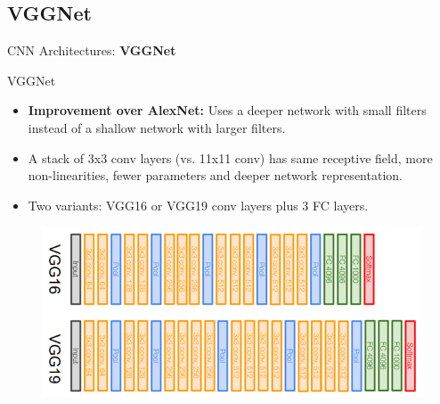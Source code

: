 \subsection{VGGNet}
\begin{frame}{}
    \LARGE CNN Architectures: \textbf{VGGNet}
\end{frame}

\begin{frame}{VGGNet}
    \begin{itemize}
        \item \textbf{Improvement over AlexNet:} Uses a deeper network with small filters instead of a shallow network with larger filters.
        \item A stack of 3x3 conv layers (vs. 11x11 conv) has same receptive field, more non-linearities, fewer parameters and deeper network representation.
        \item Two variants: VGG16 or VGG19 conv layers plus 3 FC layers.
    \end{itemize}

    \begin{figure}
        \centering
        \includegraphics[width=1.0\textwidth,height=0.5\textheight,keepaspectratio]{images/cnn/VGG_16_19.png}
    \end{figure}
    
\end{frame}